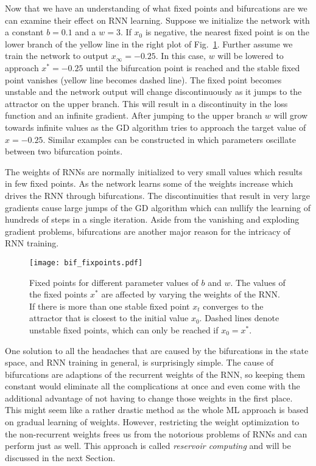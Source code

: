 Now that we have an understanding of what fixed points and bifurcations are we
can examine their effect on RNN learning. Suppose we initialize the network
with a constant $b=0.1$ and a $w=3$. If $x_0$ is negative, the nearest fixed
point is on the lower branch of the yellow line in the right plot of
Fig.~\ref{fig:fixed_points}.  Further assume we train the network to output
$x_\infty = - 0.25$.  In this case, $w$ will be lowered to approach $x^*= -
0.25$ until the bifurcation point is reached and the stable fixed point
vanishes (yellow line becomes dashed line). The fixed point becomes unstable
and the network output will change discontinuously as it jumps to the attractor
on the upper branch.  This will result in a discontinuity in the loss function
and an infinite gradient.  After jumping to the upper branch $w$ will grow
towards infinite values as the GD algorithm tries to approach the target value
of $x = - 0.25$.  Similar examples can be constructed in which parameters
oscillate between two bifurcation points.

The weights of RNNs are normally initialized to very small values which results
in few fixed points. As the network learns some of the weights increase which
drives the RNN through bifurcations.  The discontinuities that result in very
large gradients cause large jumps of the GD algorithm which can nullify the
learning of hundreds of steps in a single iteration. Aside from the vanishing
and exploding gradient problems, bifurcations are another major reason for the
intricacy of RNN training.

\begin{figure}
  \texttt{[image: bif\_fixpoints.pdf]}
  \caption{Fixed points for different parameter values of $b$ and $w$.  The
    values of the fixed points $x^*$ are affected by varying the weights of the
    RNN.  If there is more than one stable fixed point $x_t$ converges to the
    attractor that is closest to the initial value $x_0$.  Dashed lines denote
    unstable fixed points, which can only be reached if $x_0 = x^*$.}
  \label{fig:fixed_points}
\end{figure}

One solution to all the headaches that are caused by the bifurcations in the
state space, and RNN training in general, is surprisingly simple.  The cause of
bifurcations are adaptions of the recurrent weights of the RNN, so keeping them
constant would eliminate all the complications at once and even come with the
additional advantage of not having to change those weights in the first place.
This might seem like a rather drastic method as the whole ML approach is based on
gradual learning of weights. However, restricting the weight optimization to the
non-recurrent weights frees us from the notorious problems of RNNs and can
perform just as well.  This approach is called \emph{reservoir computing} and
will be discussed in the next Section.
